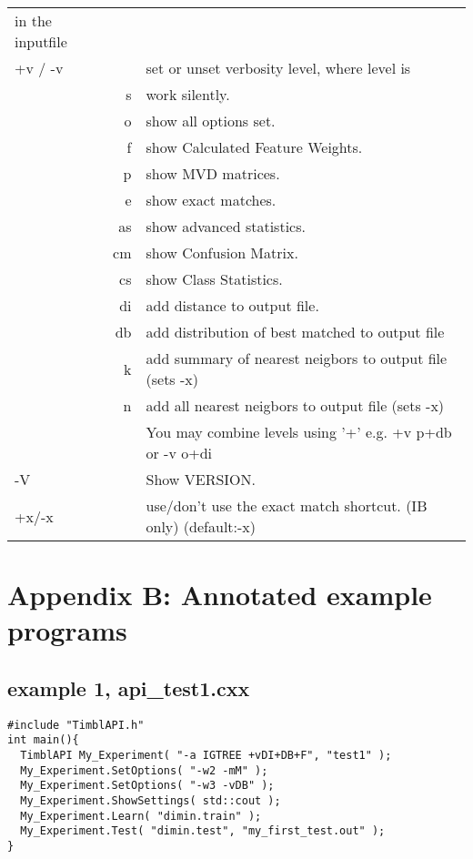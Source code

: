 \begin{tabular}{|l|r|l|}
   in the inputfile \\
+v / -v &    & set or unset verbosity level, where level is \\
   & s  & work silently. \\
   & o  & show all options set. \\
   & f  & show Calculated Feature Weights. \\
   & p  & show MVD matrices. \\
   & e  & show exact matches. \\
   & as & show advanced statistics. \\
   & cm & show Confusion Matrix. \\
   & cs & show Class Statistics. \\
   & di & add distance to output file. \\
   & db & add distribution of best matched to output file \\
   & k  & add summary of nearest neigbors to output file   (sets -x) \\
   & n  & add all nearest neigbors to output file   (sets -x) \\
   &    &  You may combine levels using '+' e.g. +v p+db or -v o+di \\
-V & & Show VERSION. \\
+x/-x & & use/don't use the exact match shortcut.
 (IB only) (default:-x)\\
\hline
\end{tabular}

\clearpage
\section{Appendix B: Annotated example programs}

\subsection{example 1, api\_test1.cxx}
\begin{footnotesize}
\begin{verbatim}	
#include "TimblAPI.h"
int main(){
  TimblAPI My_Experiment( "-a IGTREE +vDI+DB+F", "test1" );
  My_Experiment.SetOptions( "-w2 -mM" );
  My_Experiment.SetOptions( "-w3 -vDB" );
  My_Experiment.ShowSettings( std::cout );
  My_Experiment.Learn( "dimin.train" );  
  My_Experiment.Test( "dimin.test", "my_first_test.out" );  
}
\end{verbatim}
\end{footnotesize}


